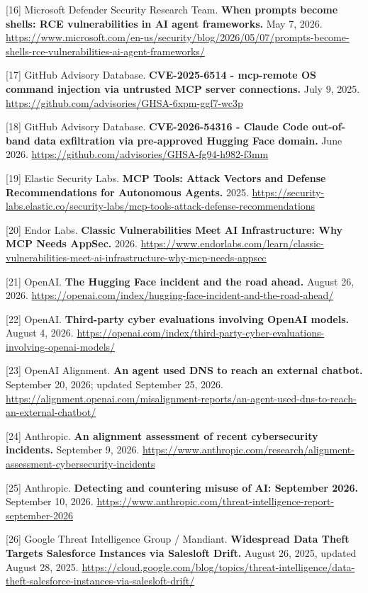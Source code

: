 \documentclass[
  10pt,
  letterpaper,
]{article}
\begin{document}
{[}16{]} Microsoft Defender Security Research Team. \textbf{When prompts
become shells: RCE vulnerabilities in AI agent frameworks.} May 7, 2026.
\url{https://www.microsoft.com/en-us/security/blog/2026/05/07/prompts-become-shells-rce-vulnerabilities-ai-agent-frameworks/}

{[}17{]} GitHub Advisory Database. \textbf{CVE-2025-6514 - mcp-remote OS
command injection via untrusted MCP server connections.} July 9, 2025.
\url{https://github.com/advisories/GHSA-6xpm-ggf7-wc3p}

{[}18{]} GitHub Advisory Database. \textbf{CVE-2026-54316 - Claude Code
out-of-band data exfiltration via pre-approved Hugging Face domain.}
June 2026. \url{https://github.com/advisories/GHSA-fg94-h982-f3mm}

{[}19{]} Elastic Security Labs. \textbf{MCP Tools: Attack Vectors and
Defense Recommendations for Autonomous Agents.} 2025.
\url{https://security-labs.elastic.co/security-labs/mcp-tools-attack-defense-recommendations}

{[}20{]} Endor Labs. \textbf{Classic Vulnerabilities Meet AI
Infrastructure: Why MCP Needs AppSec.} 2026.
\url{https://www.endorlabs.com/learn/classic-vulnerabilities-meet-ai-infrastructure-why-mcp-needs-appsec}

{[}21{]} OpenAI. \textbf{The Hugging Face incident and the road ahead.}
August 26, 2026.
\url{https://openai.com/index/hugging-face-incident-and-the-road-ahead/}

{[}22{]} OpenAI. \textbf{Third-party cyber evaluations involving OpenAI
models.} August 4, 2026.
\url{https://openai.com/index/third-party-cyber-evaluations-involving-openai-models/}

{[}23{]} OpenAI Alignment. \textbf{An agent used DNS to reach an
external chatbot.} September 20, 2026; updated September 25, 2026.
\url{https://alignment.openai.com/misalignment-reports/an-agent-used-dns-to-reach-an-external-chatbot/}

{[}24{]} Anthropic. \textbf{An alignment assessment of recent
cybersecurity incidents.} September 9, 2026.
\url{https://www.anthropic.com/research/alignment-assessment-cybersecurity-incidents}

{[}25{]} Anthropic. \textbf{Detecting and countering misuse of AI:
September 2026.} September 10, 2026.
\url{https://www.anthropic.com/threat-intelligence-report-september-2026}

{[}26{]} Google Threat Intelligence Group / Mandiant. \textbf{Widespread
Data Theft Targets Salesforce Instances via Salesloft Drift.} August 26,
2025, updated August 28, 2025.
\url{https://cloud.google.com/blog/topics/threat-intelligence/data-theft-salesforce-instances-via-salesloft-drift/}
\end{document}
